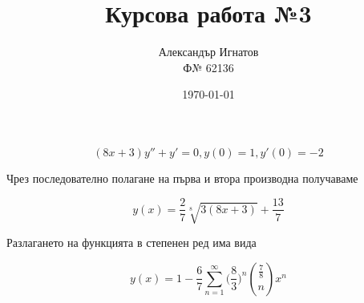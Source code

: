 \documentclass{article}
\title{Курсова работа №3}
\author{Александър Игнатов \\ Ф№ 62136 }
\date{\today}
\begin{document}
\maketitle

\[
    (8x+3)y'' + y' = 0, y(0) = 1, y'(0) = -2
\]

Чрез последователно полагане на първа и втора производна получаваме

\[
    y(x) = \frac{2}{7}\sqrt[8]{3(8x+3)} + \frac{13}{7}
\]

Разлагането на функцията в степенен ред има вида

\[
    y(x) = 1 - \frac{6}{7}\sum_{n=1}^{\infty} \bigg(\frac{8}{3}\bigg)^n \binom{\frac{7}{8}}{n} x^n
\]
\end{document}
